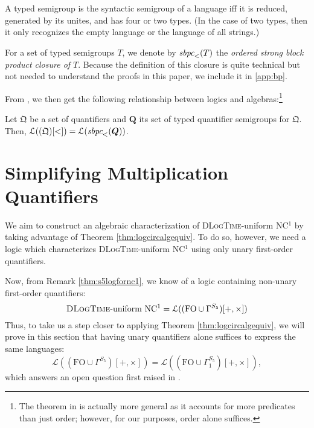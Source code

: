 \documentclass[a4paper,UKenglish,cleveref, autoref, thm-restate, anonymous]{lipics-v2021}
\begin{document}
\begin{proposition}
    A typed semigroup is the syntactic semigroup of a language iff it is reduced, generated by its unites, and has four or two types. (In the case of two types, then it only recognizes the empty language or the language of all strings.)
\end{proposition}

\begin{definition}
    For a set of typed semigroups $T$, we denote by $\emph{sbpc}_<(T)$ the \emph{ordered strong block product closure of $T$}. Because the definition of this closure is quite technical but not needed to understand the proofs in this paper, we include it in \autoref{app:bp}.
\end{definition}

From \cite[Theorem 4.14]{krebs2008typed}, we then get the following relationship between logics and algebras:\footnote{The theorem in \cite{krebs2008typed} is actually more general as it accounts for more predicates than just order; however, for our purposes, order alone suffices.}
\begin{theorem}\label{thm:logcircalgequiv}
    Let $\mathfrak{Q}$ be a set of quantifiers and $\bm{Q}$ its set of typed quantifier semigroups for $\mathfrak{Q}$. Then, \(
        \mathcal{L}((\mathfrak{Q})[<]) = \mathcal{L}(\emph{sbpc}_<(\bm{Q}))
    \).
\end{theorem}
\iffalse
TODO: remove comments before submission if not needed
Then, via \cite[Corollary 5.13]{krebs2008typed}, we obtain an algebraic characterization of \textsc{DLogTime}-uniform TC${}^0$:
\begin{corollary}\label{cor:algfortc0}
    \(\textsc{DLogTime}\emph{-uniform}\ \emph{TC}^0 = \mathcal{L}(\emph{sbpc}_<(\{(\mathbb{Z}, \mathbb{Z}^+, \pm 1), (\mathbb{N}, \mathbb{S}, \{0,1\})\}))\)
\end{corollary}
\fi
\section{Simplifying Multiplication Quantifiers}\label{sec:mult}


We aim to construct an algebraic characterization of \textsc{DLogTime}-uniform NC${}^1$ by taking advantage of Theorem \ref{thm:logcircalgequiv}. To do so, however, we need a logic which characterizes \textsc{DLogTime}-uniform NC${}^1$ using only unary first-order quantifiers.

Now, from Remark \ref{thm:s5logfornc1}, we know of a logic containing non-unary first-order quantifiers:
\begin{equation*}\label{eq:foo1}
    \text{\textsc{DLogTime}-uniform NC${}^1$} = \mathcal{L}((\text{FO} \cup \Gamma^{S_5})[+,\times])
\end{equation*} Thus, to take us a step closer to applying Theorem \ref{thm:logcircalgequiv}, we will prove in this section that having unary quantifiers alone suffices to express the same languages: \[
    \mathcal{L}((\text{FO} \cup \Gamma^{S_5})[+,\times]) = \mathcal{L}((\text{FO} \cup \Gamma^{S_5}_1)[+,\times]),
\] which answers an open question first raised in \cite{lautemann2001descriptive}.
\end{document}
